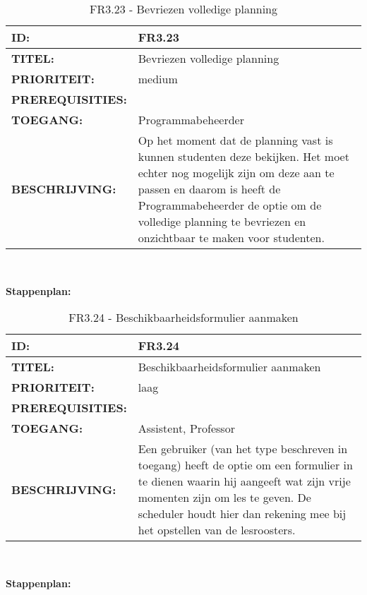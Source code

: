 \noindent\begin{table}[H]
            \begin{tabular}{l | p{10cm}}
                \textbf{ID:} & FR3.23 \\ \hline
                \textbf{TITEL:} & Bevriezen volledige planning\\ \hline
                \textbf{PRIORITEIT:} &  medium \\ \hline
                \textbf{PREREQUISITIES:} & \\ \hline
                \textbf{TOEGANG:} & Programmabeheerder \\ \hline
                \textbf{BESCHRIJVING:} & Op het moment dat de planning vast is kunnen studenten deze bekijken. Het moet echter nog mogelijk zijn om deze aan te passen en daarom is heeft de Programmabeheerder de optie om de volledige planning te bevriezen en onzichtbaar te maken voor studenten.\\ 
            \end{tabular}\\
            \caption{FR3.23 - Bevriezen volledige planning}
            \label{tab:FR3.23 - Bevriezen volledige planning}
        \end{table}   

\textbf{Stappenplan:}

\noindent\begin{table}[H]
            \begin{tabular}{l | p{10cm}}
                \textbf{ID:} & FR3.24 \\ \hline
                \textbf{TITEL:} & Beschikbaarheidsformulier aanmaken\\ \hline
                \textbf{PRIORITEIT:} &  laag \\ \hline
                \textbf{PREREQUISITIES:} & \\ \hline
                \textbf{TOEGANG:} & Assistent, Professor \\ \hline
                \textbf{BESCHRIJVING:} & Een gebruiker (van het type beschreven in toegang) heeft de optie om een formulier in te dienen waarin hij aangeeft wat zijn vrije momenten zijn om les te geven. De scheduler houdt hier dan rekening mee bij het opstellen van de lesroosters.\\ 
            \end{tabular}\\
            \caption{FR3.24 - Beschikbaarheidsformulier aanmaken}
            \label{tab:FR24 - Beschikbaarheidsformulier aanmaken}
        \end{table}


\textbf{Stappenplan:}